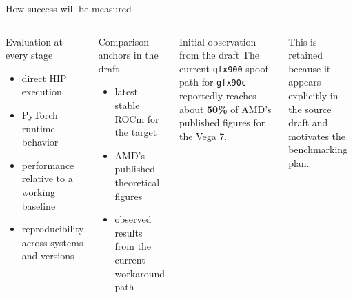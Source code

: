 \documentclass[aspectratio=169,11pt]{beamer}
\newcommand{\kw}[1]{\textbf{#1}}
\newcommand{\mono}[1]{\texttt{#1}}
\newcommand{\smalltag}[1]{\textcolor{WarmGray}{\footnotesize #1}}
\begin{document}
\begin{frame}[shrink=8]{How success will be measured}
    \begin{columns}[T,onlytextwidth]
        \begin{block}{Evaluation at every stage}
            \begin{itemize}
                \item direct HIP execution
                \item PyTorch runtime behavior
                \item performance relative to a working baseline
                \item reproducibility across systems and versions
            \end{itemize}
        \end{block}

        \begin{block}{Comparison anchors in the draft}
            \begin{itemize}
                \item latest stable ROCm for the target
                \item AMD's published theoretical figures
                \item observed results from the current workaround path
            \end{itemize}
        \end{block}

        \begin{exampleblock}{Initial observation from the draft}
            The current \mono{gfx900} spoof path for \mono{gfx90c} reportedly reaches about \kw{50\%} of AMD's published figures for the Vega 7.
        \end{exampleblock}

        \smalltag{This is retained because it appears explicitly in the source draft and motivates the benchmarking plan.}
    \end{columns}
\end{frame}
\end{document}
